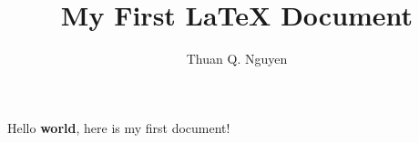 \documentclass{article}
\begin{document}
\title{My First \LaTeX{} Document}
\author{Thuan Q. Nguyen}
\maketitle

Hello \textbf{world}, here is my first document! %
\end{document}
